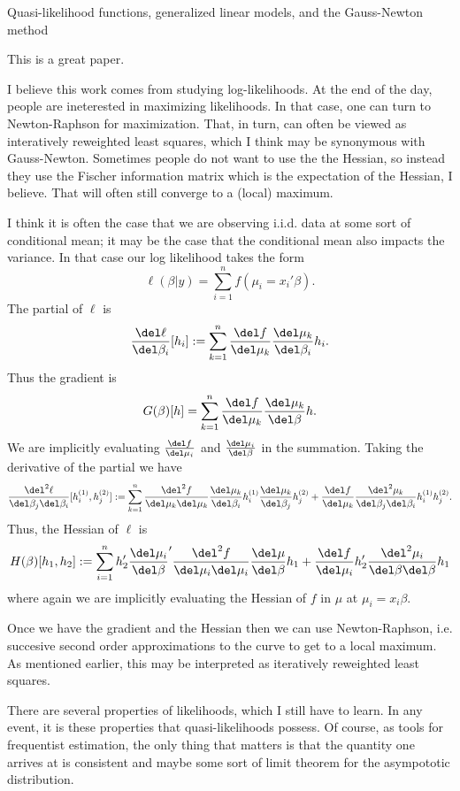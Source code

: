 \documentclass{article}
\newcommand{\graddel}[2]{\frac{\del #1}{\del #2}}
\newcommand{\hessdel}[3]{\frac{\del^2 #1}{\del #2 \del #3}}
\begin{document}
Quasi-likelihood functions, generalized linear models, and the Gauss-Newton method

This is a great paper.

I believe this work comes from studying log-likelihoods.  At the end of the day,
people are ineterested in maximizing likelihoods.  In that case, one can turn to
Newton-Raphson for maximization.  That, in turn, can often be viewed as
interatively reweighted least squares, which I think may be synonymous with
Gauss-Newton.  Sometimes people do not want to use the the Hessian, so instead
they use the Fischer information matrix which is the expectation of the Hessian,
I believe.  That will often still converge to a (local) maximum.

I think it is often the case that we are observing i.i.d. data at some sort of
conditional mean; it may be the case that the conditional mean also impacts the
variance.  In that case our log likelihood takes the form
\[
\ell(\beta | y) = \sum_{i=1}^n f(\mu_i = x_i' \beta).
\]
The partial of $\ell$ is
\[
\graddel{\ell}{\beta_i}[h_i]:= \sum_{k=1}^n \graddel{f}{\mu_k}
\graddel{\mu_k}{\beta_i} h_i.
\]
Thus the gradient is
\[
G(\beta)[h] = \sum_{k=1}^n \graddel{f}{\mu_k}
\graddel{\mu_k}{\beta} h.
\]
We are implicitly evaluating $\graddel{f}{\mu_i}$ and $\graddel{\mu_i}{\beta}$ in
the summation.  Taking the derivative of the partial we have
\[
\hessdel{\ell}{\beta_j}{\beta_i}[h_i^{(1)}, h_j^{(2)}]:= \sum_{k=1}^n
\hessdel{f}{\mu_k}{\mu_k} \graddel{\mu_k}{\beta_i} h_i^{(1)}
\graddel{\mu_k}{\beta_j} h_j^{(2)} + \graddel{f}{\mu_k}
\hessdel{\mu_k}{\beta_j}{\beta_i} h_i^{(1)} h_j^{(2)}.
\]
Thus, the Hessian of $\ell$ is
\[
H(\beta)[h_1, h_2] := 
\sum_{i=1}^n h_2' 
\graddel{\mu_i}{\beta}' \hessdel{f}{\mu_i}{\mu_i}\graddel{\mu}{\beta} h_1 
+ \graddel{f}{\mu_i} h_2' \hessdel{\mu_i}{\beta}{\beta} h_1
\]
where again we are implicitly evaluating the Hessian of $f$ in $\mu$ at $\mu_i =
x_i \beta$.

Once we have the gradient and the Hessian then we can use Newton-Raphson,
i.e. succesive second order approximations to the curve to get to a local
maximum.  As mentioned earlier, this may be interpreted as iteratively
reweighted least squares.  

There are several properties of likelihoods, which I still have to learn.  In
any event, it is these properties that quasi-likelihoods possess.  Of course, as
tools for frequentist estimation, the only thing that matters is that the
quantity one arrives at is consistent and maybe some sort of limit theorem for
the asympototic distribution.
\end{document}
